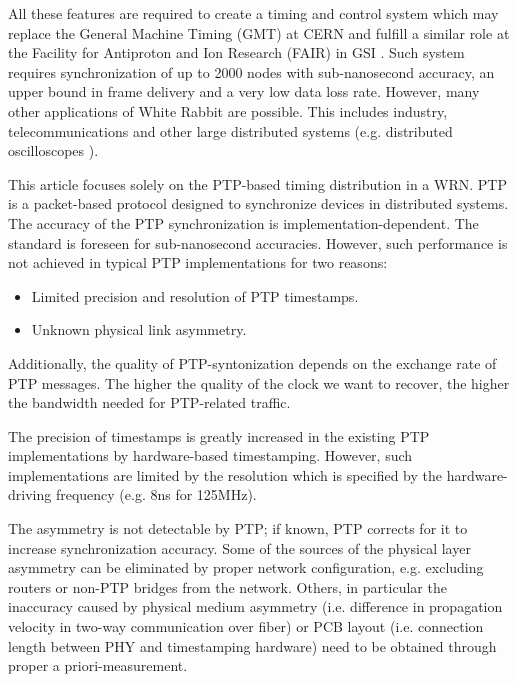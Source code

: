 All these features are required to create a timing and control system which may
replace the General Machine Timing (GMT) \cite{biblio:GMT} at CERN and
fulfill a similar role at the Facility for Antiproton and Ion
Research (FAIR) in GSI \cite{biblio:FAIRtimingSystem}. Such system requires 
synchronization of up to 2000 nodes with sub-nanosecond accuracy, 
an upper bound in frame delivery and a very low data loss rate.
However, many other applications of White Rabbit are possible. This includes industry,
telecommunications and other large distributed systems (e.g. distributed
oscilloscopes \cite{biblio:distOscilloscope}).

This article focuses solely on the PTP-based timing distribution in a WRN. PTP is a packet-based
protocol designed to synchronize devices in distributed systems. The accuracy of the PTP
synchronization is implementation-dependent. The standard is foreseen for 
sub-nanosecond accuracies. However, such performance is not achieved in typical PTP
implementations for two reasons:
\begin{itemize}
  \item Limited precision and resolution of PTP timestamps.
  \item Unknown physical link asymmetry. 
\end{itemize}
Additionally, the quality of PTP-syntonization depends on the exchange rate 
of PTP messages. The higher the quality of the clock we want to recover, 
the higher the bandwidth needed for PTP-related traffic.

The precision of timestamps is greatly increased in the existing PTP implementations
by hardware-based timestamping. However, such implementations
are limited by the resolution which is specified by the hardware-driving frequency
(e.g. 8ns for 125MHz).

The asymmetry is not detectable by PTP; if known, PTP corrects for it to increase
synchronization accuracy. Some of the sources of the physical layer asymmetry can be
eliminated by proper network configuration, e.g. excluding routers or non-PTP bridges from the
network. Others, in particular the inaccuracy caused by physical medium asymmetry (i.e.
difference in propagation velocity in two-way communication over fiber) or PCB layout (i.e.
connection length between PHY and timestamping hardware) need to be obtained through proper a
priori-measurement. 

